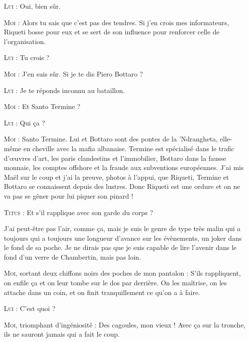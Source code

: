 \textsc{Lui} : Oui, bien sûr.

\textsc{Moi} : Alors tu sais que c’est pas des tendres. Si j’en crois mes informateurs, Riqueti bosse pour eux et se sert de son influence pour renforcer celle de l’organisation.

\textsc{Lui} : Tu crois ?

\textsc{Moi} : J’en suis sûr. Si je te dis Piero Bottaro ?

\textsc{Lui} : Je te réponds inconnu au bataillon.

\textsc{Moi} : Et Santo Termine ?

\textsc{Lui} : Qui ça ?

\textsc{Moi} : Santo Termine. Lui et Bottaro sont des pontes de la ’Ndrangheta, elle-même en cheville avec la mafia albanaise. Termine est spécialisé dans le trafic d’œuvres d’art, les paris clandestins et l’immobilier, Bottaro dans la fausse monnaie, les comptes offshore et la fraude aux subventions européennes. J’ai mis Maël sur le coup et j’ai la preuve, photos à l’appui, que Riqueti, Termine et Bottaro se connaissent depuis des lustres. Donc Riqueti est une ordure et on ne va pas se gêner pour lui piquer son pinard !

\textsc{Titus} : Et s’il rapplique avec son garde du corps ?

J’ai peut-être pas l’air, comme ça, mais je suis le genre de type très malin qui a toujours qui a toujours une longueur d’avance sur les évènements, un joker dans le fond de sa poche. Je ne dirais pas que je suis capable de lire l’avenir dans le fond d’un verre de Chambertin, mais pas loin.

\textsc{Moi}, sortant deux chiffons noirs des poches de mon pantalon : S’ils rappliquent, on enfile ça et on leur tombe sur le dos par derrière. On les maîtrise, on les attache dans un coin, et on finit tranquillement ce qu’on a à faire.

\textsc{Lui} : C’est quoi ?

\textsc{Moi}, triomphant d’ingéniosité : Des cagoules, mon vieux ! Avec ça sur la tronche, ils ne sauront jamais qui a fait le coup.

